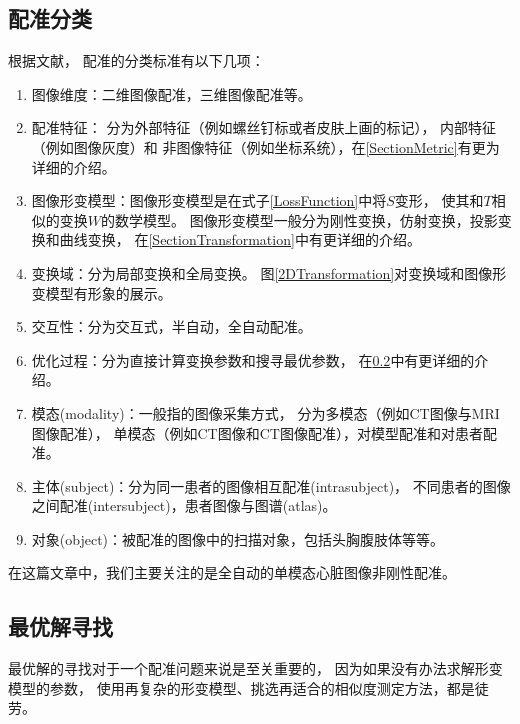 \subsection{配准分类}\label{RegistrationClassification}
根据文献\cite{RegistrationSurvey,RegistrationSurveyNew}，
配准的分类标准有以下几项：
\begin{enumerate}
  \item 图像维度：二维图像配准，三维图像配准等。
  \item 配准特征：
    分为外部特征（例如螺丝钉标或者皮肤上画的标记），
    内部特征（例如图像灰度）和
    非图像特征（例如坐标系统），在\ref{SectionMetric}有更为详细的介绍。
  \item 图像形变模型：图像形变模型是在式子\ref{LossFunction}中将$S$变形，
    使其和$T$相似的变换$W$的数学模型。
    图像形变模型一般分为刚性变换，仿射变换，投影变换和曲线变换，
    在\ref{SectionTransformation}中有更详细的介绍。
  \item 变换域：分为局部变换和全局变换。
    图\ref{2DTransformation}对变换域和图像形变模型有形象的展示。
  \item 交互性：分为交互式，半自动，全自动配准。
  \item 优化过程：分为直接计算变换参数和搜寻最优参数，
    在\ref{SectionOptimization}中有更详细的介绍。
  \item 模态(modality)：一般指的图像采集方式，
    分为多模态（例如CT图像与MRI图像配准），
    单模态（例如CT图像和CT图像配准），对模型配准和对患者配准。
  \item 主体(subject)：分为同一患者的图像相互配准(intrasubject)，
    不同患者的图像之间配准(intersubject)，患者图像与图谱(atlas)。
  \item 对象(object)：被配准的图像中的扫描对象，包括头胸腹肢体等等。
\end{enumerate}

在这篇文章中，我们主要关注的是全自动的单模态心脏图像非刚性配准。





\subsection{最优解寻找}\label{SectionOptimization}
最优解的寻找对于一个配准问题来说是至关重要的，
因为如果没有办法求解形变模型的参数，
使用再复杂的形变模型、挑选再适合的相似度测定方法，都是徒劳。

